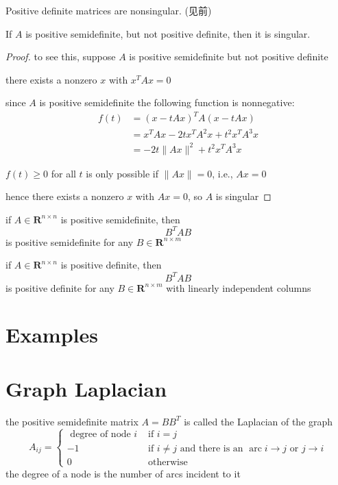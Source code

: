 \begin{theorem}
    Positive definite matrices are nonsingular. (见前)
\end{theorem}

\begin{theorem}
    If $A$ is positive semidefinite, but not positive definite, then it is singular.
\end{theorem}

\begin{proof}
    to see this, suppose $ A $ is positive semidefinite but not positive definite

    there exists a nonzero $ x $ with $ x^{T} A x=0 $


since $ A $ is positive semidefinite the following function is nonnegative:
$$
\begin{aligned}
f(t) &=(x-t A x)^{T} A(x-t A x) \\
&=x^{T} A x-2 t x^{T} A^{2} x+t^{2} x^{T} A^{3} x \\
&=-2 t\|A x\|^{2}+t^{2} x^{T} A^{3} x
\end{aligned}
$$

$ f(t) \geq 0 $ for all $ t $ is only possible if $ \|A x\|=0 $, i.e., $ A x=0 $

hence there exists a nonzero $ x $ with $ A x=0 $, so $ A $ is singular
\end{proof}

\begin{corollary}
    if $ A \in \mathbf{R}^{n \times n} $ is positive semidefinite, then
$$
B^{T} A B
$$
is positive semidefinite for any $ B \in \mathbf{R}^{n \times m} $
\end{corollary}

\begin{corollary}
    if $ A \in \mathbf{R}^{n \times n} $ is positive definite, then
$$
B^{T} A B
$$
is positive definite for any $ B \in \mathbf{R}^{n \times m} $ with linearly independent columns
\end{corollary}

\section{Examples}

\section{Graph Laplacian}

\begin{definition}
    the positive semidefinite matrix $ A=B B^{T} $ is called the Laplacian of the graph
$$
A_{i j}=\left\{\begin{array}{ll}
\text { degree of node } i & \text { if } i=j \\
-1 & \text { if } i \neq j \text { and there is an } \operatorname{arc} i \rightarrow j \text { or } j \rightarrow i \\
0 & \text { otherwise }
\end{array}\right.
$$
the degree of a node is the number of arcs incident to it
\end{definition}

